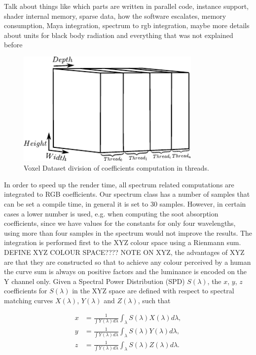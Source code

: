 Talk about things like which parts are written in parallel code, instance support, shader internal memory, sparse data, how the software escalates, memory consumption, Maya integration, spectrum to rgb integration, maybe more details about units for black body radiation and everything that was not explained before

\begin{figure}[htbp!]
\centering
\includegraphics[width=0.8\textwidth]{img/voxel_thread_division}
	\caption{Voxel Dataset division of coefficients computation in threads.}
	\label{fig:voxel_dataset_threaded}
\end{figure}

In order to speed up the render time, all spectrum related computations are integrated to RGB coefficients.
Our spectrum class has a number of samples that can be set a compile time, in general it is set to 30 samples.
However, in certain cases a lower number is used, e.g. when computing the soot absorption coefficients, since we have values for the constants for only four wavelengths, using more than four samples in the spectrum would not improve the results.
The integration is performed first to the XYZ colour space using a Rienmann sum.
DEFINE XYZ COLOUR SPACE????
NOTE ON XYZ, the advantages of XYZ are that they are constructed so that to achieve any colour perceived by a human the curve sum is always on positive factors and the luminance is encoded on the Y channel only.
Given a Spectral Power Distribution (SPD) $S(\lambda)$, the $x$, $y$, $z$ coefficients for $S(\lambda)$ in the XYZ space are defined with respect to spectral matching curves $X(\lambda)$, $Y(\lambda)$ and $Z(\lambda)$, such that

\begin{equation}
\begin{split}
x &= \frac{1}{\int Y(\lambda) d\lambda} \int_\lambda S(\lambda) X(\lambda) d\lambda, \\
y &= \frac{1}{\int Y(\lambda) d\lambda} \int_\lambda S(\lambda) Y(\lambda) d\lambda, \\
z &= \frac{1}{\int Y(\lambda) d\lambda} \int_\lambda S(\lambda) Z(\lambda) d\lambda.
\end{split}
\end{equation}

